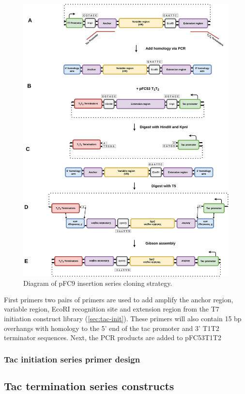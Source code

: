 \documentclass[11pt]{article}
\begin{document}
\begin{figure}[H]
	\includegraphics[width=15cm]{images/cloning_diagrams/construct_diagrams-Tac-initiation-series.png}
	\centering
	\caption{Diagram of pFC9 insertion series cloning strategy.}
\end{figure}

First primers two pairs of primers are used to add amplify the anchor region, variable region, EcoRI recognition site and extension region from the T7 initiation construct library (\ref{sec:tac-init}). These primers will also contain 15 bp overhangs with homology to the 5' end of the tac promoter and 3' T1T2 terminator sequences. Next, the PCR products are added to pFC53T1T2 

\subsubsection{Tac initiation series primer design}

\subsection{Tac termination series constructs}
\label{sec:tac-termination}
\end{document}
